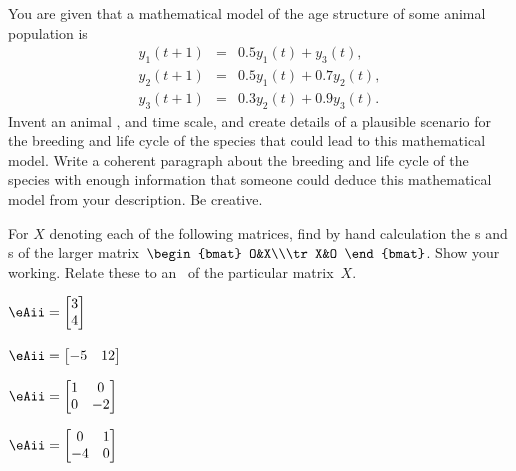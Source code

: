 \begin{exercise}  
You are given that a mathematical model of the age structure of some animal population is
\begin{eqnarray*}
y_1(t+1)&=& 0.5y_1(t)+y_3(t),\\
y_2(t+1)&=& 0.5y_1(t)+0.7y_2(t),\\
y_3(t+1)&=& 0.3y_2(t)+0.9y_3(t).
\end{eqnarray*}
Invent an animal , and time scale, and create details of a plausible scenario for the breeding and life cycle of the species that could lead to this mathematical model.  
Write a coherent paragraph about the breeding and life cycle of the species with enough information that someone could deduce this mathematical model from your description.  
Be creative.
\end{exercise}











\begin{exercise}  
For \(X\) denoting each of the following matrices, find by hand calculation the s and s of the larger matrix~\(\begin{bmat} O&X\\\tr X&O \end{bmat}\).
Show your working.
Relate these to an \svd\ of the particular matrix~\(X\).
\begin{Parts}
\item \(\eAii=\begin{bmatrix} 3\\4 \end{bmatrix}\)

\item \(\eAii=\begin{bmatrix} -5&12 \end{bmatrix}\)

\item \(\eAii=\begin{bmatrix} 1&0\\0&-2 \end{bmatrix}\)

\item \(\eAii=\begin{bmatrix} 0&1\\-4&0 \end{bmatrix}\)

\end{Parts}
\end{exercise}





